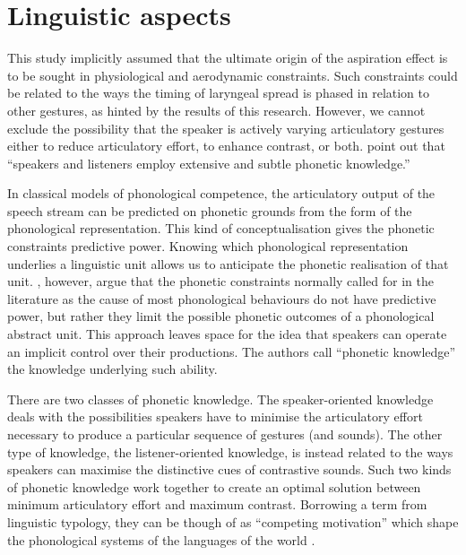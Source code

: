 \documentclass[11pt,a4paper,openany]{memoir}\usepackage[]{graphicx}\usepackage[]{color}
\begin{document}

\section{Linguistic aspects}
\label{s:lingusitic}
This study implicitly assumed that the ultimate origin of the aspiration effect is to be sought in physiological and aerodynamic constraints.
Such constraints could be related to the ways the timing of laryngeal spread is phased in relation to other gestures, as hinted by the results of this research.
However, we cannot exclude the possibility that the speaker is actively varying articulatory gestures either to reduce articulatory effort, to enhance contrast, or both.
\citet[423]{kingston1994} point out that ``speakers and listeners employ extensive and subtle phonetic knowledge.''

In classical models of phonological competence, the articulatory output of the speech stream can be predicted on phonetic grounds from the form of the phonological representation.
This kind of conceptualisation gives the phonetic constraints predictive power.
Knowing which phonological representation underlies a linguistic unit allows us to anticipate the phonetic realisation of that unit. 
\citeauthor{kingston1994}, however, argue that the phonetic constraints normally called for in the literature as the cause of most phonological behaviours do not have predictive power, but rather they limit the possible phonetic outcomes of a phonological abstract unit.
This approach leaves space for the idea that speakers can operate an implicit control over their productions.
The authors call ``phonetic knowledge'' the knowledge underlying such ability.

There are two classes of phonetic knowledge.
The speaker-oriented knowledge deals with the possibilities speakers have to minimise the articulatory effort necessary to produce a particular sequence of gestures (and sounds).
The other type of knowledge, the listener-oriented knowledge, is instead related to the ways speakers can maximise the distinctive cues of contrastive sounds.
Such two kinds of phonetic knowledge work together to create an optimal solution between minimum articulatory effort and maximum contrast.
Borrowing a term from linguistic typology, they can be though of as ``competing motivation'' which shape the phonological systems of the languages of the world \citep{haiman1983,croft2002}.
\end{document}
